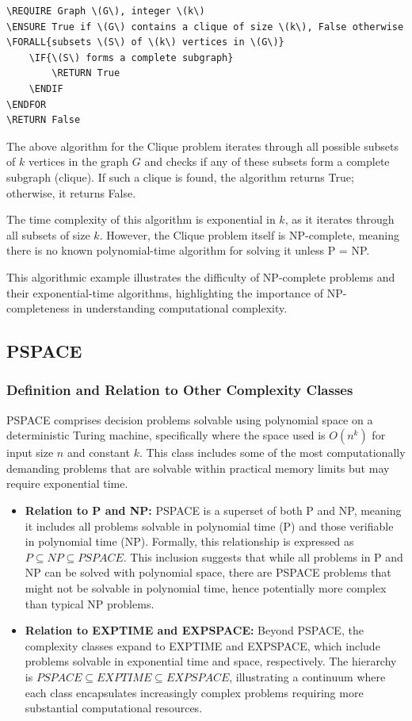 \begin{lstlisting}[caption={Clique}]
\REQUIRE Graph \(G\), integer \(k\)
\ENSURE True if \(G\) contains a clique of size \(k\), False otherwise
\FORALL{subsets \(S\) of \(k\) vertices in \(G\)}
    \IF{\(S\) forms a complete subgraph}
        \RETURN True
    \ENDIF
\ENDFOR
\RETURN False
\end{lstlisting}

The above algorithm for the Clique problem iterates through all possible subsets of \(k\) vertices in the graph \(G\) and checks if any of these subsets form a complete subgraph (clique). If such a clique is found, the algorithm returns True; otherwise, it returns False.

The time complexity of this algorithm is exponential in \(k\), as it iterates through all subsets of size \(k\). However, the Clique problem itself is NP-complete, meaning there is no known polynomial-time algorithm for solving it unless P = NP.

This algorithmic example illustrates the difficulty of NP-complete problems and their exponential-time algorithms, highlighting the importance of NP-completeness in understanding computational complexity.


\subsection{PSPACE}

\subsubsection{Definition and Relation to Other Complexity Classes}
PSPACE comprises decision problems solvable using polynomial space on a deterministic Turing machine, specifically where the space used is \(O(n^k)\) for input size \(n\) and constant \(k\). This class includes some of the most computationally demanding problems that are solvable within practical memory limits but may require exponential time.

\begin{itemize}
    \item \textbf{Relation to P and NP:}
    PSPACE is a superset of both P and NP, meaning it includes all problems solvable in polynomial time (P) and those verifiable in polynomial time (NP). Formally, this relationship is expressed as \(P \subseteq NP \subseteq PSPACE\). This inclusion suggests that while all problems in P and NP can be solved with polynomial space, there are PSPACE problems that might not be solvable in polynomial time, hence potentially more complex than typical NP problems.

    \item \textbf{Relation to EXPTIME and EXPSPACE:}
    Beyond PSPACE, the complexity classes expand to EXPTIME and EXPSPACE, which include problems solvable in exponential time and space, respectively. The hierarchy is \(PSPACE \subseteq EXPTIME \subseteq EXPSPACE\), illustrating a continuum where each class encapsulates increasingly complex problems requiring more substantial computational resources.
\end{itemize}

